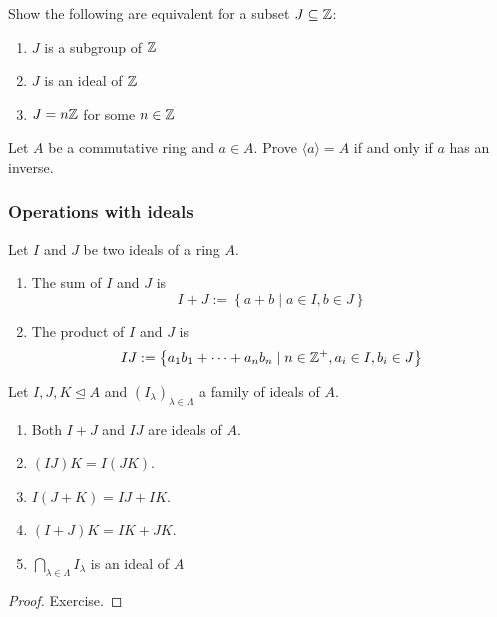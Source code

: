 \documentclass[11pt,a4paper]{article}
\begin{document}
\begin{eje}
Show the following are equivalent for a subset \(J\subseteq \mathbb{Z}\):
\begin{enumerate}[label=(\roman*)]
\item \(J\) is a subgroup of \(\mathbb{Z}\)
\item \(J\) is an ideal of \(\mathbb{Z}\)
\item \(J = n \mathbb{Z}\) for some \(n\in \mathbb{Z}\)
\end{enumerate}
\end{eje}

\begin{eje}
    Let \(A\) be a commutative ring and \(a\in A\).
    Prove \(\langle a \rangle  = A\) if and only if \(a\) has an inverse.
\end{eje}



\subsubsection{Operations with ideals}


\begin{defi}
Let \(I\) and \(J\) be two ideals of a ring \(A\).
\begin{enumerate}[label=(\roman*)]
\item  The sum of \(I\) and \(J\) is 
\[I+J := \left\{ a+b \mid a \in I, b\in J \right\}\]
\item The product of \(I\) and \(J\) is 
\[IJ := \left\{ a_1b_1 +\cdots + a_nb_n \mid  n\in\mathbb{Z}^+ , a_i \in I, b_i\in J\right\}\]
\end{enumerate}
\end{defi}

\begin{prop}
    Let \(I,J,K\trianglelefteq A\) and \(\left( I_\lambda \right)_{\lambda\in\Lambda}\)   a family of ideals of \(A\).
\begin{enumerate}[label=(\roman*)]
    \item Both \(I+J\) and \(IJ\) are ideals of  \(A\).
    \item $(I J) K=I(J K)$.
    \item $I(J+K)=I J+I K$.
    \item $(I+J) K=I K+J K$.
    \item \(\bigcap\limits_{\lambda \in \Lambda} I_\lambda\) is an ideal of \(A\)
\end{enumerate}
\end{prop}

\begin{proof}
    Exercise.
\end{proof}
\end{document}
